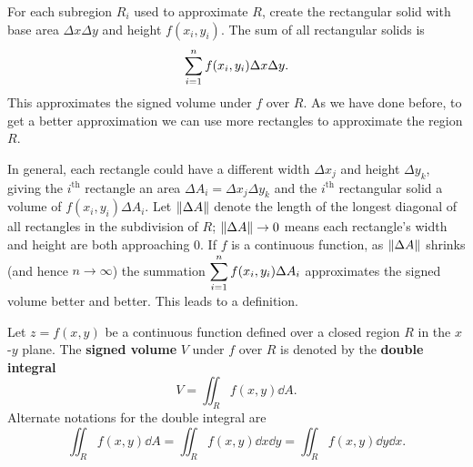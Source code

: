 For each subregion $R_i$ used to approximate $R$, create the rectangular solid with base area $\Delta x\Delta y$ and height $f(x_i,y_i)$. The sum of all rectangular solids is
\[\displaystyle \sum_{i=1}^n f(x_i,y_i)\Delta x\Delta y.\]
This approximates the signed volume under $f$ over $R$. As we have done before, to get a better approximation we can use more rectangles to approximate the region $R$.

In general, each rectangle could have a different width $\Delta x_j$ and height $\Delta y_k$, giving the $i^{\text{th}}$ rectangle an area $\Delta A_i = \Delta x_j\Delta y_k$ and the $i^{\text{th}}$ rectangular solid a volume of $f(x_i,y_i)\Delta A_i$. Let $\left\lVert \Delta A \right\rVert$ denote the length of the longest diagonal of all rectangles in the subdivision of $R$; $\left\lVert \Delta A \right\rVert\to 0$ means each rectangle's width and height are both approaching 0. If $f$ is a continuous function, as $\left\lVert \Delta A \right\rVert$ shrinks (and hence $n\to\infty$) the summation $\displaystyle \sum_{i=1}^n f(x_i,y_i)\Delta A_i$ approximates the signed volume better and better. This leads to a definition.


\begin{definition}\label{def:double_int}%
Let $z=f(x,y)$ be a continuous function defined over a closed region $R$ in the $x$-$y$ plane. The \textbf{signed volume} $V$ under $f$ over $R$ is denoted by the \textbf{double integral}\vspace{-.5\baselineskip}
\[V = \iint_R f(x,y)\dd A.\]
Alternate notations for the double integral are
\[\iint_R f(x,y)\dd A=\iint_R f(x,y)\dd x\dd y=\iint_R f(x,y)\dd y\dd x.\]
\end{definition}

